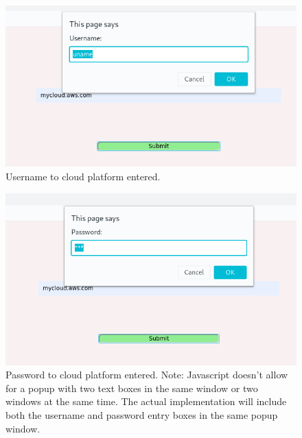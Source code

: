 \documentclass{article}
\begin{document}
    \begin{figure}[h]
    \includegraphics[scale=.7]{s2}
        \caption{Username to cloud platform entered.}
        \label{fig:clouduname}
    \end{figure}

    \begin{figure}[h]
    \includegraphics[scale=.7]{s3}
        \caption{Password to cloud platform entered. Note: Javascript doesn't allow for a popup with two text boxes in
        the same window or two windows at the same time. The actual implementation
        will include both the username and password entry boxes in the same popup window.}
        \label{fig:cloudpass}
    \end{figure}
\end{document}
